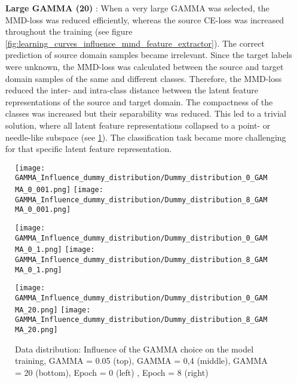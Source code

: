 \begin{itemize}
    \item [\textbf{Large GAMMA (20)}]:
    When a very large GAMMA was selected, the MMD-loss was reduced efficiently, whereas the source CE-loss was increased throughout the training (see figure \ref{fig:learning_curves_influence_mmd_feature_extractor}). The correct prediction of source domain samples became irrelevant. Since the target labels were unknown, the MMD-loss was calculated between the source and target domain samples of the same and different classes. Therefore, the MMD-loss reduced the inter- and intra-class distance between the latent feature representations of the source and target domain. The compactness of the classes was increased but their separability was reduced. This led to a trivial solution, where all latent feature representations collapsed to a point- or needle-like subspace (see \ref{fig:point_cloud_mmd}). The classification task became more challenging for that specific latent feature representation.
\end{itemize}

\begin{figure}[H]
  \centering
  \texttt{[image: GAMMA\_Influence\_dummy\_distribution/Dummy\_distribution\_0\_GAMMA\_0\_001.png]}
  \hspace{.4cm}
  \texttt{[image: GAMMA\_Influence\_dummy\_distribution/Dummy\_distribution\_8\_GAMMA\_0\_001.png]}

  \vspace{.1cm}

  \texttt{[image: GAMMA\_Influence\_dummy\_distribution/Dummy\_distribution\_0\_GAMMA\_0\_1.png]}
  \hspace{.4cm}
  \texttt{[image: GAMMA\_Influence\_dummy\_distribution/Dummy\_distribution\_8\_GAMMA\_0\_1.png]}

  \vspace{.1cm}

  \texttt{[image: GAMMA\_Influence\_dummy\_distribution/Dummy\_distribution\_0\_GAMMA\_20.png]}
  \hspace{.4cm}
  \texttt{[image: GAMMA\_Influence\_dummy\_distribution/Dummy\_distribution\_8\_GAMMA\_20.png]}
 

  \caption{Data distribution: Influence of the GAMMA choice on the model training, GAMMA = 0.05 (top), GAMMA = 0,4 (middle), GAMMA = 20 (bottom), Epoch = 0 (left) , Epoch = 8 (right)}
  \label{fig:point_cloud_mmd}
\end{figure}


